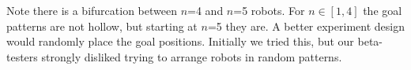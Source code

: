 Note there is a bifurcation between $n$=4 and $n$=5 robots. For $n\in[1,4]$ the goal patterns are not hollow, but starting at $n$=5 they are.  A better experiment design would randomly place the goal positions.  Initially we tried this, but our beta-testers strongly disliked trying to arrange robots in random patterns.
